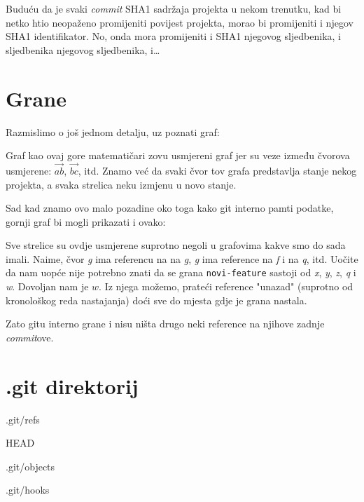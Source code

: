 Buduću da je svaki \emph{commit} SHA1 sadržaja projekta u nekom trenutku, kad bi netko htio neopaženo promijeniti povijest projekta, morao bi promijeniti i njegov SHA1 identifikator.
No, onda mora promijeniti i SHA1 njegovog sljedbenika, i sljedbenika njegovog sljedbenika, i\dots

\section*{Grane}

Razmislimo o još jednom detalju, uz poznati graf:



Graf kao ovaj gore matematičari zovu usmjereni graf jer su veze između čvorova usmjerene: $\vec{ab}$, $\vec{bc}$, itd.
Znamo već da svaki čvor tov grafa predstavlja stanje nekog projekta, a svaka strelica neku izmjenu u novo stanje.

Sad kad znamo ovo malo pozadine oko toga kako git interno pamti podatke, gornji graf bi mogli prikazati i ovako:



Sve strelice su ovdje usmjerene suprotno negoli u grafovima kakve smo do sada imali.
Naime, čvor \emph g ima referencu na na \emph g, \emph g ima reference na \emph f i na \emph q, itd.
Uočite da nam uopće nije potrebno znati da se grana \verb+novi-feature+ sastoji od \emph x, \emph y, \emph z, \emph q i \emph w.
Dovoljan nam je $w$.
Iz njega možemo, prateći reference "unazad" (suprotno od kronološkog reda nastajanja) doći sve do mjesta gdje je grana nastala.

Zato gitu interno grane i nisu ništa drugo neki reference na njihove zadnje \emph{commit}ove.

\section*{.git direktorij}





.git/refs

HEAD

.git/objects

.git/hooks


